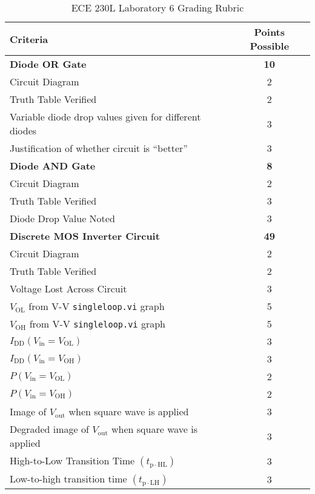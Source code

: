 \documentclass[12pt]{../manual}
\begin{document}
%
\newpage
\def\arraystretch{1.2}
{}
\hspace{0pt}
\vfill %
\begin{table}[ht!]
\caption{ECE 230L Laboratory 6 Grading Rubric}
\centering
\begin{tabular}{l|c} \hline
Criteria & Points Possible \\ \hline \hline
\textbf{Diode OR Gate}			& \textbf{10} \\
Circuit Diagram 				& 2 \\
Truth Table Verified			& 2 \\
Variable diode drop values given for different diodes & 3 \\
Justification of whether circuit is ``better'' & 3 \\ \hline
\textbf{Diode AND Gate}			& \textbf{8} \\
Circuit Diagram 				& 2 \\
Truth Table Verified			& 3 \\
Diode Drop Value Noted			& 3 \\ \hline
\textbf{Discrete MOS Inverter Circuit}		& \textbf{49} \\
Circuit Diagram 				& 2 \\
Truth Table Verified			& 2 \\
Voltage Lost Across Circuit 	& 3 \\
$V_\mathrm{OL}$ from V-V {\tt singleloop.vi} graph 	& 5 \\
$V_\mathrm{OH}$ from V-V {\tt singleloop.vi} graph	& 5 \\
$I_\mathrm{DD}(V_\mathrm{in} = V_\mathrm{OL})$ & 3 \\
$I_\mathrm{DD}(V_\mathrm{in} = V_\mathrm{OH})$ & 3 \\
$P(V_\mathrm{in} = V_\mathrm{OL})$ & 2 \\
$P(V_\mathrm{in} = V_\mathrm{OH})$ & 2 \\
Image of $V_\mathrm{out}$ when square wave is applied & 3 \\
Degraded image of $V_\mathrm{out}$ when square wave is applied & 3 \\
High-to-Low Transition Time $(t_\mathrm{p \cdot HL})$ & 3 \\
Low-to-high transition time $(t_\mathrm{p \cdot LH})$ & 3 \\

\end{tabular}
\end{table}
\end{document}
